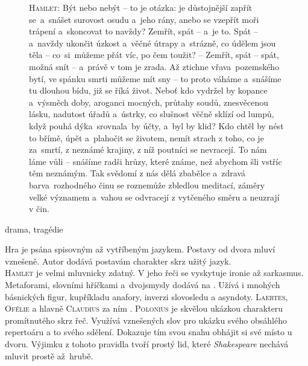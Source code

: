 \documentclass[FGBook.tex]{subfiles}
\begin{document}
\changefontsize{6.8pt}


\noindent\begin{figure}
\tiny{}\setlength{\parindent}{3pt}\noindent\textsc{Hamlet:} Být nebo nebýt -- to je otázka:
je důstojnější zapřít se~a~snášet surovost osudu a~jeho rány, anebo se vzepřít moři trápení a~skoncovat to navždy?
Zemřít, spát -- a~je to.
Spát -- a~navždy ukončit úzkost a~věčné útrapy a~strázně, co údělem jsou těla -- co~si~můžeme přát víc, po čem toužit?
-- Zemřít, spát -- spát, možná snít -- a~právě v tom je zrada.
Až ztichne vřava~pozemského bytí, ve spánku smrti můžeme mít sny -- to proto váháme a~snášíme tu dlouhou bídu, již se říká život.
Neboť kdo vydržel by kopance a~výsměch doby, aroganci mocných, průtahy soudů, znesvěcenou lásku, nadutost úřadů a~ústrky, co slušnost věčně sklízí od lumpů, když pouhá dýka~srovnala~by účty, a~byl by klid?
Kdo chtěl by nést to břímě, úpět a~plahočit se životem, nemít strach z toho, co je za~smrtí, z neznámé krajiny, z níž poutníci se nevracejí.
To nám láme vůli -- snášíme radši hrůzy, které známe, než abychom šli vstříc těm neznámým.
Tak svědomí z nás dělá zbabělce a~zdravá barva~rozhodného činu se roznemůže zbledlou meditací, záměry velké významem a~vahou se odvracejí z vytčeného směru a neuzrají v čin.
\end{figure}


\noindent drama, tragédie


\noindent Hra je psána spisovným až vytříbeným jazykem.
Postavy od dvora mluví vznešeně.
Autor dodává postavám charakter skrz užitý jazyk. \\
\textsc{Hamlet} je velmi mluvnicky zdatný.
V jeho řeči se vyskytuje ironie až sarkasmus.
Metaforami, slovními hříčkami a~dvojsmysly dodává na .
Užívá i mnohých básnických figur, kupříkladu anafory, inverzi slovosledu a asyndoty.
\textsc{Laertes}, \textsc{Ofélie} a hlavně \textsc{Claudius} za ním .
\textsc{Polonius} je skvělou ukázkou charakteru promítnutého skrz řeč.
Využívá  vznešených slov pro ukázku svého obsáhlého repertoáru a to  svého sdělení.
Dokazuje tím svou snahu obhájit si své místo u dvoru.
Výjimku z tohoto pravidla tvoří prostý lid, které \textit{Shakespeare} nechává mluvit prostě až~hrubě.  
\end{document}
